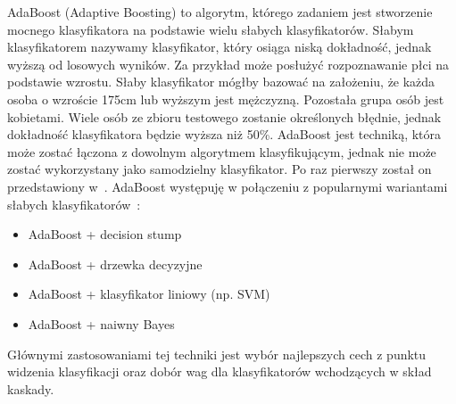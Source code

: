
AdaBoost (Adaptive Boosting) to algorytm, którego zadaniem jest stworzenie mocnego klasyfikatora na podstawie wielu słabych klasyfikatorów.
Słabym klasyfikatorem nazywamy klasyfikator, który osiąga niską dokładność, jednak wyższą od losowych wyników.
Za przykład może posłużyć rozpoznawanie płci na podstawie wzrostu.
Słaby klasyfikator mógłby bazować na założeniu, że każda osoba o wzroście 175cm lub wyższym jest mężczyzną.
Pozostała grupa osób jest kobietami.
Wiele osób ze zbioru testowego zostanie określonych błędnie, jednak dokładność klasyfikatora będzie wyższa niż 50\%.
AdaBoost jest techniką, która może zostać łączona z dowolnym algorytmem klasyfikującym, jednak nie może zostać wykorzystany jako samodzielny klasyfikator.
Po raz pierwszy został on przedstawiony w~\cite{Freund1996ExperimentsWA}.
AdaBoost występuję w połączeniu z popularnymi wariantami słabych klasyfikatorów~\cite{szybka_detekcja_klesk}:
\begin{itemize}
    \item AdaBoost + decision stump
    \item AdaBoost + drzewka decyzyjne
    \item AdaBoost + klasyfikator liniowy (np. SVM)
    \item AdaBoost + naiwny Bayes
\end{itemize}
Głównymi zastosowaniami tej techniki jest wybór najlepszych cech z punktu widzenia klasyfikacji oraz dobór wag dla klasyfikatorów wchodzących w skład kaskady.


